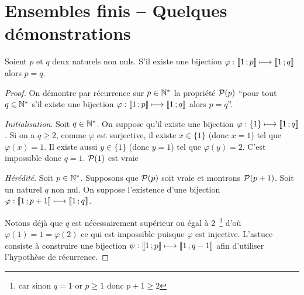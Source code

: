 \chapter{Ensembles finis -- Quelques démonstrations}
\label{chap:ensemblesFinis}
\begin{theo}
  Soient \(p\) et \(q\) deux naturels non nuls. S'il existe une bijection \(\varphi : \intervalleentier{1}{p} \longmapsto \intervalleentier{1}{q}\) alors \(p=q\).
\end{theo}
\begin{proof}
  On démontre par récurrence sur \(p \in \N^*\) la propriété \(\P(p)\) ``pour tout \(q \in \N^*\) s'il existe une bijection \(\varphi : \intervalleentier{1}{p} \longmapsto \intervalleentier{1}{q}\) alors \(p=q\)''.

\emph{Initialisation}. Soit \(q \in \N^*\). On suppose qu'il existe une bijection \(\varphi : \{1\} \longmapsto \intervalleentier{1}{q}\). Si on a \(q \geq 2\), comme \(\varphi\) est surjective, il existe \(x \in \{1\}\) (donc \(x=1\)) tel que \(\varphi(x)=1\). Il existe aussi \(y \in \{1\}\) (donc \(y=1\)) tel que \(\varphi(y) = 2\). C'est impossible donc \(q=1\). \(\P(1)\) est vraie

\emph{Hérédité}. Soit \(p \in \N^*\). Supposons que \(\P(p)\) soit vraie et montrons \(\P(p+1)\). Soit un naturel \(q\) non nul. On suppose l'existence d'une bijection \(\varphi : \intervalleentier{1}{p+1} \longmapsto \intervalleentier{1}{q}\).

Notons déjà que \(q\) est nécessairement supérieur ou égal à 2~\footnote{car sinon \(q=1\) or \(p \geq 1\) donc \(p+1 \geq 2\)} d'où \(\varphi(1)=1=\varphi(2)\) ce qui est impossible puisque \(\varphi\) est injective. L'astuce consiste à construire une bijection \(\psi : \intervalleentier{1}{p} \longmapsto \intervalleentier{1}{q-1}\) afin d'utiliser l'hypothèse de récurrence.


\end{proof}
